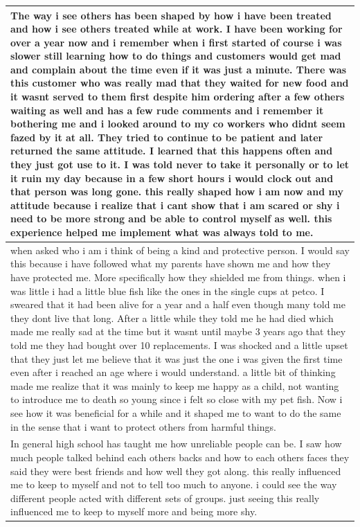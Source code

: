 \documentclass[
  .7em,
  letterpaper,
  DIV=11,
  numbers=noendperiod]{scrartcl}
\begin{document}
\begin{table}
\begin{tabular}{l}
The way i see others has been shaped by how i have been treated and how i see others treated while at work. I have been working for over a year now and i remember when i first started of course i was slower still learning how to do things and customers would get mad and complain about the time even if it was just a minute. There was this customer who was really mad that they waited for new food and it wasnt served to them first despite him ordering after a few others waiting as well and has a few rude comments and i remember it bothering me and i looked around to my co workers who didnt seem fazed by it at all. They tried to continue to be patient and later returned the same attitude. I learned that this happens often and they just got use to it. I was told never to take it personally or to let it ruin my day because in a few short hours i would clock out and that person was long gone. this really shaped how i am now and my attitude because i realize that i cant show that i am scared or shy i need to be more strong and be able to control myself as well. this experience helped me implement what was always told to me.\\
\hline
when asked who i am i think of being a kind and protective person. I would say this because i have followed what my parents have shown me and how they have protected me. More specifically how they shielded me from things. when i was little i had a little blue fish like the ones in the single cups at petco. I sweared that it had been alive for a year and a half even though many told me they dont live that long. After a little while they told me he had died which made me really sad at the time but it wasnt until maybe 3 years ago that they told me they had bought over 10 replacements. I was shocked and a little upset that they just let me believe that it was just the one i was given the first time even after i reached an age where i would understand. a little bit of thinking made me realize that it was mainly to keep me happy as a child, not wanting to introduce me to death so young since i felt so close with my pet fish. Now i see how it was beneficial for a while and it shaped me to want to do the same in the sense that i want to protect others from harmful things.\\
\hline
In general high school has taught me how unreliable people can be. I saw how much people talked behind each others backs and how to each others faces they said they were best friends and how well they got along. this really influenced me to keep to myself and not to tell too much to anyone. i could see the way different people acted with different sets of groups. just seeing this really influenced me to keep to myself more and being more shy.\\

\end{tabular}
\end{table}
\end{document}

